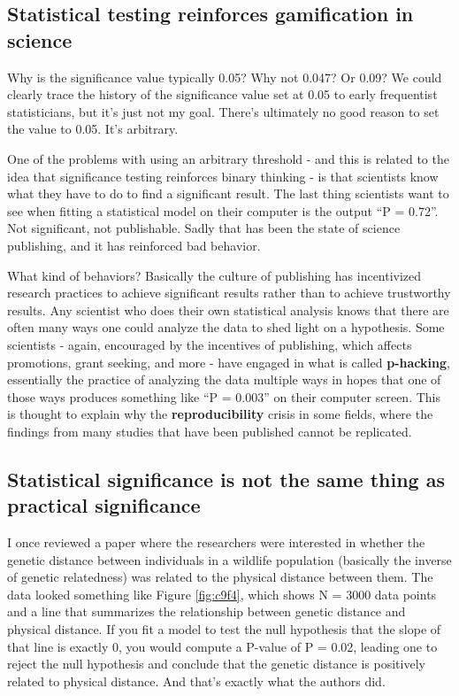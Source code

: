 \documentclass[
]{book}
\begin{document}
\subsection{Statistical testing reinforces gamification in science}\label{statistical-testing-reinforces-gamification-in-science}

Why is the significance value typically 0.05? Why not 0.047? Or 0.09? We could clearly trace the history of the significance value set at 0.05 to early frequentist statisticians, but it's just not my goal. There's ultimately no good reason to set the value to 0.05. It's arbitrary.

One of the problems with using an arbitrary threshold - and this is related to the idea that significance testing reinforces binary thinking - is that scientists know what they have to do to find a significant result. The last thing scientists want to see when fitting a statistical model on their computer is the output ``P = 0.72''. Not significant, not publishable. Sadly that has been the state of science publishing, and it has reinforced bad behavior.

What kind of behaviors? Basically the culture of publishing has incentivized research practices to achieve significant results rather than to achieve trustworthy results. Any scientist who does their own statistical analysis knows that there are often many ways one could analyze the data to shed light on a hypothesis. Some scientists - again, encouraged by the incentives of publishing, which affects promotions, grant seeking, and more - have engaged in what is called \textbf{p-hacking}, essentially the practice of analyzing the data multiple ways in hopes that one of those ways produces something like ``P = 0.003'' on their computer screen. This is thought to explain why the \textbf{reproducibility} crisis in some fields, where the findings from many studies that have been published cannot be replicated.

\subsection{Statistical significance is not the same thing as practical significance}\label{statistical-significance-is-not-the-same-thing-as-practical-significance}

I once reviewed a paper where the researchers were interested in whether the genetic distance between individuals in a wildlife population (basically the inverse of genetic relatedness) was related to the physical distance between them. The data looked something like Figure \ref{fig:c9f4}, which shows N = 3000 data points and a line that summarizes the relationship between genetic distance and physical distance. If you fit a model to test the null hypothesis that the slope of that line is exactly 0, you would compute a P-value of P = 0.02, leading one to reject the null hypothesis and conclude that the genetic distance is positively related to physical distance. And that's exactly what the authors did.
\end{document}
